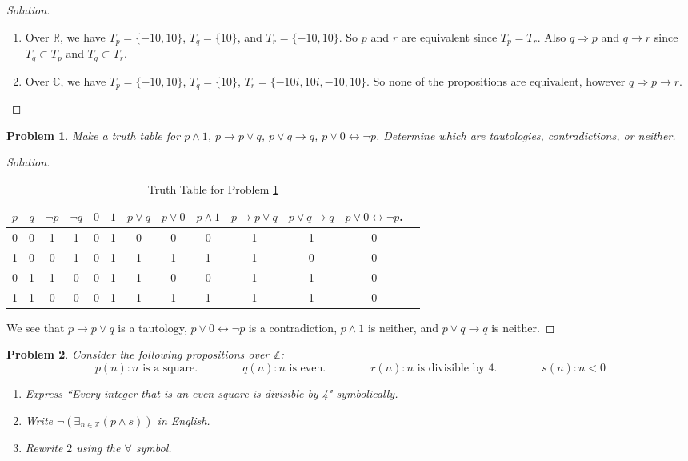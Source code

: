 \documentclass[oneside]{book}
\theoremstyle{mystyle}
\newtheorem{problem}{Problem}[section]
\begin{document}
\begin{proof}[Solution]
\
\begin{enumerate}
    \item Over $\mathbb{R}$, we have $T_{p} = \{-10,10\}$, $T_{q} = \{10\}$, and $T_{r} = \{-10,10\}$. So $p$ and $r$ are equivalent since $T_{p} = T_{r}$. Also $q\Rightarrow p$ and $q\rightarrow r$ since $T_{q} \subset T_{p}$ and $T_{q}\subset T_{r}$.
    \item Over $\mathbb{C}$, we have $T_{p} = \{-10,10\}$, $T_{q} = \{10\}$, $T_{r} = \{-10i,10i,-10,10\}$. So none of the propositions are equivalent, however $q\Rightarrow p \rightarrow r$.
\end{enumerate}
\end{proof}
\begin{problem}
\label{problem:discrete structures_make_a_truth_table_for_p_and_1_and_more}
Make a truth table for $p\land 1$, $p\rightarrow p\lor q$, $p\lor q \rightarrow q$, $p\lor 0 \leftrightarrow \neg p$. Determine which are tautologies, contradictions, or neither.
\end{problem}
\begin{proof}[Solution]
\begin{table}[H]
    \centering
    \begin{tabular}{c c c c c c c c c c c c c} 
         \hline 
         $p$ & $q$ & $\neg p$ & $\neg q$ & $0$ & $1$ & $p\lor q$ & $p \lor 0$ & $p\land 1$ & $p\rightarrow p\lor q$ & $p\lor q \rightarrow q$ & $p\lor 0 \leftrightarrow \neg p$.\\ [0.5ex] 
         \hline
         0 & 0 & 1 & 1 & 0 & 1 & 0 & 0 & 0 & 1 & 1 & 0 \\
         1 & 0 & 0 & 1 & 0 & 1 & 1 & 1 & 1 & 1 & 0 & 0 \\
         0 & 1 & 1 & 0 & 0 & 1 & 1 & 0 & 0 & 1 & 1 & 0 \\
         1 & 1 & 0 & 0 & 0 & 1 & 1 & 1 & 1 & 1 & 1 & 0 \\
         \hline
    \end{tabular}
    \caption{Truth Table for Problem \ref{problem:discrete structures_make_a_truth_table_for_p_and_1_and_more}}
    \label{tab:my_label}
\end{table}
We see that $p\rightarrow p\lor q$ is a tautology, $p\lor 0 \leftrightarrow \neg p$ is a contradiction, $p\land 1$ is neither, and $p\lor q \rightarrow q$ is neither. 
\end{proof}
\begin{problem}
Consider the following propositions over $\mathbb{Z}$:
\begin{equation*}
    p(n): n\textrm{ is a square.} \quad\quad\quad\quad q(n): n\textrm{ is even.} \quad\quad\quad\quad r(n):	n\textrm{ is divisible by 4.}\quad\quad\quad\quad s(n): n<0
\end{equation*}
\begin{enumerate}
\item Express ``Every integer that is an even square is divisible by 4" symbolically.
\item Write $\neg(\exists_{n\in \mathbb{Z}}(p\land s))$ in English.
\item Rewrite $2$ using the $\forall$ symbol.
\end{enumerate}
\end{problem}
\end{document}
